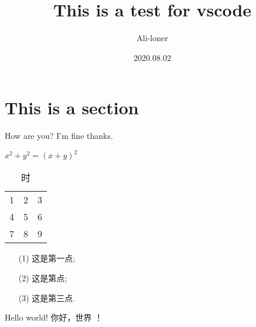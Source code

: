 \documentclass[a4paper]{article}
\title{This is a test for vscode}
\author{Ali-loner}
\date{2020.08.02}
\begin{document}
    \maketitle
    \begin{abstract}
        \lipsum[2]
    \end{abstract}
    \tableofcontents


    \section{This is a section}\label{sec:this-is-a-section}
    How are you?
    I'm fine thanks.

    $x^2+y^2 = (x+y)^2$
    \begin{table}[htbp]
        \centering
        \caption{时}
        \begin{tabular}{ccc}
            1 & 2 & 3 \\
            4 & 5 & 6 \\
            7 & 8 & 9
        \end{tabular}\label{tab:table}
    \end{table}
    \begin{enumerate}
        \item[(1)] 这是第一点;
        \item[(2)] 这是第点;
        \item[(3)] 这是第三点.
    \end{enumerate}
    Hello world!
    你好，世界 ！
\end{document}
